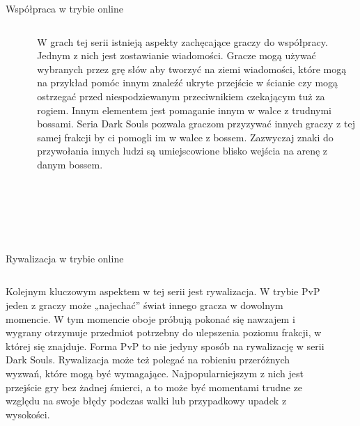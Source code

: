 \documentclass{beamer}
\begin{document}
\begin{frame}{Współpraca w trybie online} %
\begin{columns}

\begin{column}{0.5\textwidth}
    \begin{figure}
    \centering
        \texttt{[image: pomoc.jpg]}
 
    \end{figure}
\end{column}

\begin{column}{0.5\textwidth}
\small     W grach tej serii istnieją aspekty zachęcające graczy do współpracy. Jednym z nich jest zostawianie wiadomości. Gracze mogą używać wybranych przez grę słów aby tworzyć na ziemi wiadomości, które mogą na przykład pomóc innym znaleźć ukryte przejście w ścianie czy mogą ostrzegać przed niespodziewanym przeciwnikiem czekającym tuż za rogiem. Innym elementem jest pomaganie innym w walce z trudnymi bossami. Seria Dark Souls pozwala graczom przyzywać innych graczy z tej samej frakcji by ci pomogli im w walce z bossem. Zazwyczaj znaki do przywołania innych ludzi są umiejscowione blisko wejścia na arenę z danym bossem. 

\end{column}
\end{columns}
\end{frame}

\begin{frame}{Rywalizacja w trybie online} %
\begin{columns}
\begin{column}{0.5\textwidth}
\small      Kolejnym kluczowym aspektem w tej serii  jest rywalizacja. W trybie PvP jeden z graczy może „najechać” świat innego gracza w dowolnym momencie. W tym momencie oboje próbują pokonać się nawzajem i wygrany otrzymuje przedmiot potrzebny do ulepszenia poziomu frakcji, w której się znajduje. Forma PvP to nie jedyny sposób na rywalizację w serii Dark Souls. Rywalizacja może też polegać na robieniu przeróżnych wyzwań, które mogą być wymagające. Najpopularniejszym z nich jest przejście gry bez żadnej śmierci, a to może być momentami trudne ze względu na swoje błędy podczas walki lub przypadkowy upadek z wysokości. 
\end{column}

\begin{column}{0.5\textwidth}
    \begin{figure}
    \centering
        \texttt{[image: pvp.jpg]}
 
    \end{figure}
\end{column}
\end{columns}
\end{frame}
\end{document}
